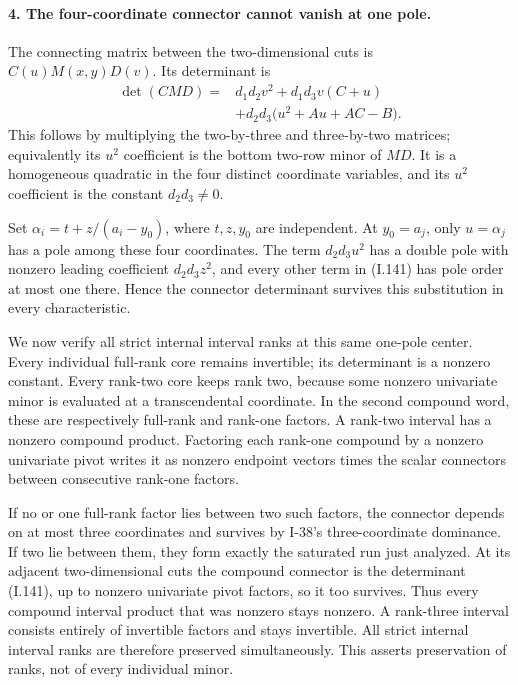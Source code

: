 \paragraph{4. The four-coordinate connector cannot vanish at one pole.}
The connecting matrix between the two-dimensional cuts is
$C(u)M(x,y)D(v)$. Its determinant is
\[
 \begin{split}
 \det(CMD)={}&d_1d_2v^2+d_1d_3v(C+u)\\
 &+d_2d_3\bigl(u^2+Au+AC-B\bigr).
 \end{split}
 \tag{I.141}
\]
This follows by multiplying the two-by-three and three-by-two
matrices; equivalently its $u^2$ coefficient is the bottom
two-row minor of $MD$. It is a homogeneous quadratic in the
four distinct coordinate variables, and its $u^2$ coefficient
is the constant $d_2d_3\ne0$.

Set $\alpha_i=t+z/(a_i-y_0)$, where $t,z,y_0$ are independent.
At $y_0=a_j$, only $u=\alpha_j$ has a pole among these four
coordinates. The term $d_2d_3u^2$ has a double pole with nonzero
leading coefficient $d_2d_3z^2$, and every other term in
(I.141) has pole order at most one there. Hence the connector
determinant survives this substitution in every characteristic.

We now verify all strict internal interval ranks at this same
one-pole center. Every individual full-rank core remains
invertible; its determinant is a nonzero constant. Every
rank-two core keeps rank two, because some nonzero univariate
minor is evaluated at a transcendental coordinate. In the
second compound word, these are respectively full-rank and
rank-one factors. A rank-two interval has a nonzero compound
product. Factoring each rank-one compound by a nonzero
univariate pivot writes it as nonzero endpoint vectors times
the scalar connectors between consecutive rank-one factors.

If no or one full-rank factor lies between two such factors,
the connector depends on at most three coordinates and survives
by I-38's three-coordinate dominance. If two lie between them,
they form exactly the saturated run just analyzed. At its
adjacent two-dimensional cuts the compound connector is the
determinant (I.141), up to nonzero univariate pivot factors,
so it too survives. Thus every compound interval product that
was nonzero stays nonzero. A rank-three interval consists
entirely of invertible factors and stays invertible. All
strict internal interval ranks are therefore preserved
simultaneously. This asserts preservation of ranks, not of
every individual minor.

